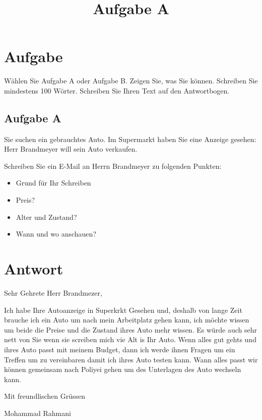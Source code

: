 \documentclass[a4paper]{article}
\title{Aufgabe A}
\date{}
\begin{document}
    \maketitle
    \section{Aufgabe}
        Wählen Sie Aufgabe A oder Aufgabe B. Zeigen Sie, was Sie können. Schreiben Sie mindestens 100 Wörter. Schreiben Sie Ihren Text auf den Antwortbogen.
        
        \subsection{Aufgabe A}
            
            Sie suchen ein gebrauchtes Auto. Im Supermarkt haben Sie eine Anzeige gesehen: Herr Brandmeyer will sein Auto verkaufen.
            
            Schreiben Sie ein E-Mail an Herrn Brandmeyer zu folgenden Punkten:
            
            \begin{itemize}
                \item Grund für Ihr Schreiben
                \item Preis?
                \item Alter und Zustand?
                \item Wann und wo anschauen?
            \end{itemize}

    \section{Antwort}
    Sehr Gehrete Herr Brandmezer,
    
    Ich habe Ihre Autoanzeige in Superkrkt Gesehen und, deshalb von lange Zeit brauche ich ein Auto um nach mein Arbeitplatz gehen kann, ich möchte wissen um beide die Preise und die Zustand ihres Auto mehr wissen. Es würde auch sehr nett von Sie wenn sie screiben mich vie Alt is Ihr Auto. Wenn alles gut gehts und ihres Auto passt mit meinem Budget, dann ich werde ihnen Fragen um ein Treffen um zu vereinbaren damit ich ihres Auto testen kann. Wann alles passt wir können gemeinsam nach Poliyei gehen um des Unterlagen des Auto wechseln kann.
    
    Mit freundlischen Grüssen
    
    Mohammad Rahmani
    
\end{document}
